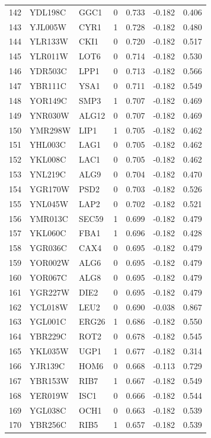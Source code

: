 \begin{longtable}{rllrrrr}
142 & YDL198C & GGC1 & 0 & 0.733 & -0.182 & 0.406\\
143 & YJL005W & CYR1 & 1 & 0.728 & -0.182 & 0.480\\
144 & YLR133W & CKI1 & 0 & 0.720 & -0.182 & 0.517\\
145 & YLR011W & LOT6 & 0 & 0.714 & -0.182 & 0.530\\
146 & YDR503C & LPP1 & 0 & 0.713 & -0.182 & 0.566\\
147 & YBR111C & YSA1 & 0 & 0.711 & -0.182 & 0.549\\
148 & YOR149C & SMP3 & 1 & 0.707 & -0.182 & 0.469\\
149 & YNR030W & ALG12 & 0 & 0.707 & -0.182 & 0.469\\
150 & YMR298W & LIP1 & 1 & 0.705 & -0.182 & 0.462\\
151 & YHL003C & LAG1 & 0 & 0.705 & -0.182 & 0.462\\
152 & YKL008C & LAC1 & 0 & 0.705 & -0.182 & 0.462\\
153 & YNL219C & ALG9 & 0 & 0.704 & -0.182 & 0.470\\
154 & YGR170W & PSD2 & 0 & 0.703 & -0.182 & 0.526\\
155 & YNL045W & LAP2 & 0 & 0.702 & -0.182 & 0.521\\
156 & YMR013C & SEC59 & 1 & 0.699 & -0.182 & 0.479\\
157 & YKL060C & FBA1 & 1 & 0.696 & -0.182 & 0.428\\
158 & YGR036C & CAX4 & 0 & 0.695 & -0.182 & 0.479\\
159 & YOR002W & ALG6 & 0 & 0.695 & -0.182 & 0.479\\
160 & YOR067C & ALG8 & 0 & 0.695 & -0.182 & 0.479\\
161 & YGR227W & DIE2 & 0 & 0.695 & -0.182 & 0.479\\
162 & YCL018W & LEU2 & 0 & 0.690 & -0.038 & 0.867\\
163 & YGL001C & ERG26 & 1 & 0.686 & -0.182 & 0.550\\
164 & YBR229C & ROT2 & 0 & 0.678 & -0.182 & 0.545\\
165 & YKL035W & UGP1 & 1 & 0.677 & -0.182 & 0.314\\
166 & YJR139C & HOM6 & 0 & 0.668 & -0.113 & 0.729\\
167 & YBR153W & RIB7 & 1 & 0.667 & -0.182 & 0.549\\
168 & YER019W & ISC1 & 0 & 0.666 & -0.182 & 0.544\\
169 & YGL038C & OCH1 & 0 & 0.663 & -0.182 & 0.539\\
170 & YBR256C & RIB5 & 1 & 0.657 & -0.182 & 0.539\\

\end{longtable}

